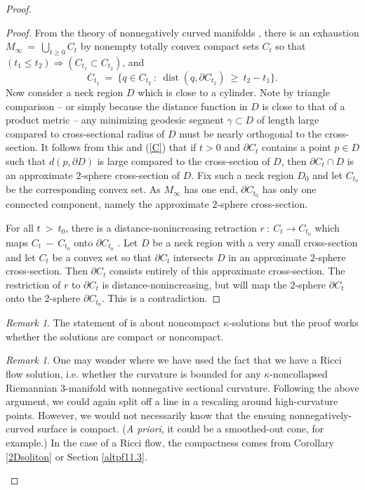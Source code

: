 \documentclass[12pt]{amsart}
\newcommand{\D}{\partial}
\newcommand{\dist}{\operatorname{dist}}
\newcommand{\ga}{\gamma}
\numberwithin{equation}{section}
\theoremstyle{plain}
\theoremstyle{definition}
\theoremstyle{remark}
\newtheorem{remark}[equation]{Remark}
\begin{document}
\begin{proof}
\begin{proof}
From the theory of nonnegatively curved manifolds
\cite[Chapter 8.5]{Cheeger-Ebin},  there is an
exhaustion $M_\infty \: = \: \bigcup_{t\ge 0}C_t$ 
by nonempty totally convex compact sets $C_t$ so that
$(t_1 \le t_2) \Rightarrow (C_{t_1} \subset C_{t_2})$, and
\begin{equation} \label{C}
C_{t_1} \: = \: \{ q \in C_{t_2} \: : \: \dist(q, \partial C_{t_2})
\: \ge \: t_2 - t_1\}. 
\end{equation}
Now consider a 
neck region $D$ which is  close to a cylinder.  Note by
triangle comparison -- or simply because the distance function
in $D$ is close to that of a product metric --  any 
minimizing geodesic  segment $\ga\subset D$
of length large compared to cross-sectional radius of $D$ must
be nearly orthogonal to the cross-section.   
It follows from this and (\ref{C}) that if $t>0$ and 
$\partial C_t$ contains a point $p\in D$ such that $d(p,\D D)$
is large compared to the cross-section of $D$, then 
 $\partial C_t\cap D$ is an approximate $2$-sphere 
cross-section of $D$. 
Fix such a neck region $D_0$ and let $C_{t_0}$ be the
corresponding convex set.
As $M_\infty$ 
has one end, $\partial C_{t_0}$ has only one connected 
component,
namely the approximate $2$-sphere cross-section.

For all $t \: > \: t_0$, there is a distance-nonincreasing retraction
$r \: : \: C_t \rightarrow C_{t_0}$ which maps $C_t \: - \: C_{t_0}$ onto
$\partial C_{t_0}$ \cite{Sharafutdinov}. Let $D$ be a neck region
with a very small cross-section and let $C_t$ be a convex set so that
$\partial C_t$ intersects $D$ in an approximate $2$-sphere cross-section.
Then $\partial C_t$ consists entirely of this approximate cross-section.
The restriction of $r$ to $\partial C_t$ is distance-nonincreasing, but
will map the $2$-sphere $\partial C_t$ onto
the $2$-sphere $\partial C_{t_0}$. This is a contradiction. 
\end{proof}

\begin{remark} The statement of \cite[Theorem 11.7]{Perelman} is about
noncompact $\kappa$-solutions but the proof works whether the
solutions are compact or noncompact.
\end{remark}


\begin{remark}
 One may wonder where we have used the fact that we have a
Ricci flow solution, i.e. whether the curvature is bounded for
any $\kappa$-noncollapsed Riemannian $3$-manifold with nonnegative
sectional curvature.  Following the above argument, we could again split off
a line in a rescaling around high-curvature points.  However, we would
not necessarily know that the ensuing nonnegatively-curved
surface is compact. ({\it A priori}, it could be a smoothed-out cone, for
example.)  In the case of a Ricci flow, the compactness comes from 
Corollary \ref{2Dsoliton} or Section \ref{altpf11.3}.
\end{remark}




\end{proof}
\end{document}
